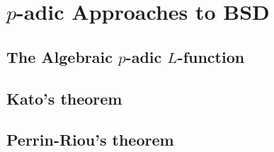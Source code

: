 \chapter{$p$-adic Approaches to BSD}
\section{The Algebraic $p$-adic $L$-function}
\section{Kato's theorem}
\section{Perrin-Riou's theorem}

